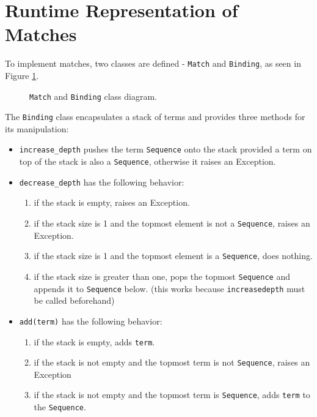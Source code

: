 \section{Runtime Representation of Matches}
\label{section:Match}

To implement matches, two classes are defined - \texttt{Match} and \texttt{Binding}, as seen in Figure \ref{class-diagram-match-binding}.

\begin{figure}[H]
	\centering
	\caption{\texttt{Match} and \texttt{Binding} class diagram.}
\label{class-diagram-match-binding}
\end{figure}

The \texttt{Binding} class encapsulates a stack of terms and provides three methods for its manipulation:

\begin{itemize}
\item 
\texttt{increase\_depth} pushes the term \texttt{Sequence} onto the stack provided a term on top of the stack is also a \texttt{Sequence}, otherwise it raises an Exception.

\item
\texttt{decrease\_depth} has the following behavior:
	\begin{enumerate}
		\item
        if the stack is empty, raises an Exception.
		\item
		if the stack size is 1 and the topmost element is not a \texttt{Sequence}, raises an Exception.
		\item
		if the stack size is 1 and the topmost element is a \texttt{Sequence}, does nothing.
		\item
        if the stack size is greater than one, pops the topmost \texttt{Sequence} and appends it to \texttt{Sequence} below. (this works because \texttt{increasedepth} must be called beforehand)
	\end{enumerate}

\item
\texttt{add(term)} has the following behavior:
	\begin{enumerate}
		\item
         if the stack is empty, adds \texttt{term}. 
		\item
         if the stack is not empty and the topmost term is not \texttt{Sequence}, raises an Exception
		\item
        if the stack is not empty and the topmost term is \texttt{Sequence}, adds \texttt{term} to the \texttt{Sequence}.
	\end{enumerate}
\end{itemize}

